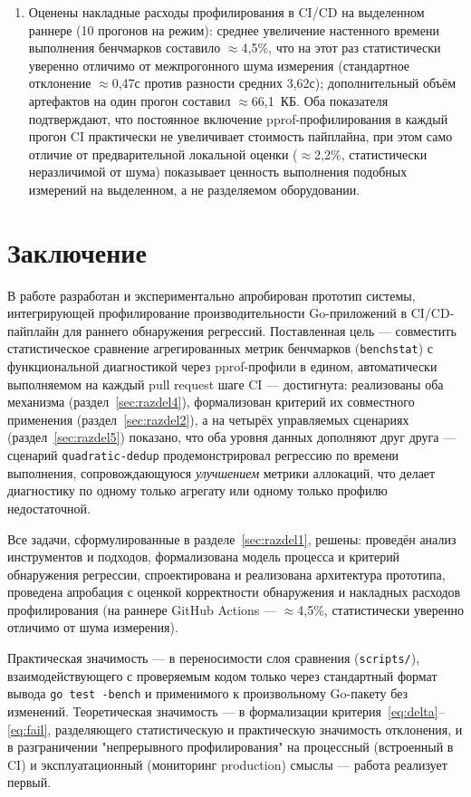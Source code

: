 \documentclass[12pt,a4paper]{article}
\newcommand{\newrazdel}{\clearpage}
\numberwithin{equation}{section}
\begin{document}
\begin{enumerate}
\item Оценены накладные расходы профилирования в CI/CD на выделенном
раннере (10 прогонов на режим): среднее увеличение настенного времени
выполнения бенчмарков составило $\approx$4,5\%, что на этот раз
статистически уверенно отличимо от межпрогонного шума измерения
(стандартное отклонение $\approx$0,47с против разности средних 3,62с);
дополнительный объём артефактов на один прогон составил
$\approx$66,1~КБ. Оба показателя подтверждают, что постоянное включение
pprof-профилирования в каждый прогон CI практически не увеличивает
стоимость пайплайна, при этом само отличие от предварительной локальной
оценки ($\approx$2,2\%, статистически неразличимой от шума) показывает
ценность выполнения подобных измерений на выделенном, а не разделяемом
оборудовании.
\end{enumerate}

\newrazdel
\section*{Заключение}

В работе разработан и экспериментально апробирован прототип системы,
интегрирующей профилирование производительности Go-приложений в
CI/CD-пайплайн для раннего обнаружения регрессий. Поставленная цель —
совместить статистическое сравнение агрегированных метрик бенчмарков
(\texttt{benchstat}) с функциональной диагностикой через pprof-профили в
едином, автоматически выполняемом на каждый pull request шаге CI —
достигнута: реализованы оба механизма (раздел~\ref{sec:razdel4}),
формализован критерий их совместного применения
(раздел~\ref{sec:razdel2}), а на четырёх управляемых сценариях
(раздел~\ref{sec:razdel5}) показано, что оба уровня данных дополняют друг
друга — сценарий \texttt{quadratic-dedup} продемонстрировал регрессию по
времени выполнения, сопровождающуюся \emph{улучшением} метрики аллокаций,
что делает диагностику по одному только агрегату или одному только
профилю недостаточной.

Все задачи, сформулированные в разделе~\ref{sec:razdel1}, решены: проведён
анализ инструментов и подходов, формализована модель процесса и критерий
обнаружения регрессии, спроектирована и реализована архитектура
прототипа, проведена апробация с оценкой корректности обнаружения и
накладных расходов профилирования (на раннере GitHub Actions —
$\approx$4,5\%, статистически уверенно отличимо от шума измерения).

Практическая значимость — в переносимости слоя сравнения
(\texttt{scripts/}), взаимодействующего с проверяемым кодом только через
стандартный формат вывода \texttt{go test -bench} и применимого к
произвольному Go-пакету без изменений. Теоретическая значимость — в
формализации критерия~\eqref{eq:delta}--\eqref{eq:fail}, разделяющего
статистическую и практическую значимость отклонения, и в разграничении
"непрерывного профилирования" на процессный (встроенный в CI) и
эксплуатационный (мониторинг production) смыслы — работа реализует
первый.
\end{document}
